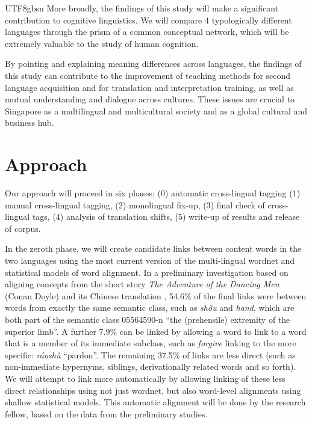 \documentclass[12pt]{book} %
\newcommand{\eng}[1]{\textit{#1}}
\newcommand{\cmn}[1]{\textit{#1}}
\begin{document}
\begin{CJK}{UTF8}{gbsn}
More broadly, the findings of this study will make a significant
contribution to cognitive linguistics.
We will compare 4 typologically different languages through the prism
of a common conceptual network, which will be extremely valuable to
the study of human cognition.

By pointing and explaining meaning differences across languages,
the findings of this study can contribute to the improvement of
teaching methods for second language acquisition and for translation
and interpretation training, as well as mutual understanding and
dialogue across cultures.
These issues are crucial to Singapore as a multilingual and
multicultural society and as a global cultural and business hub.


\section{Approach}

Our approach will proceed in six phases: (0) automatic cross-lingual tagging
(1) manual cross-lingual tagging, (2) monolingual fix-up, (3) final check of
cross-lingual tags, (4) analysis of translation shifts, (5) write-up of
results and release of corpus.

In the zeroth phase, we will create candidate links between content
words in the two languages using the most current version of the
multi-lingual wordnet and statistical models of word alignment.
In a preliminary investigation based on aligning concepts from the
short story \textit{The Adventure of the Dancing Men} (Conan Doyle)
and its Chinese translation \citep{Mok:2012}, 54.6\% of the final
links were between words from exactly the same semantic class, such as
\cmn{sh\v{o}u} and \eng{hand}, which are both part of the semantic
class 05564590-n ``the (prehensile) extremity of the superior limb''.
A further 7.9\% can be linked by allowing a word to link to a word
that is a member of its immediate subclass, such as \eng{forgive}
linking to the more specific: \cmn{r\'{a}osh\`{u}} ``pardon''.  The
remaining 37.5\% of links are less direct (such as non-immediate
hypernyms, siblings, derivationally related words and so forth).  We
will attempt to link more automatically by allowing linking of these
less direct relationships using not just wordnet, but also word-level
alignments using shallow statistical models.  This automatic alignment
will be done by the research fellow, based on the data from the
preliminary studies.


\end{CJK}
\end{document}
